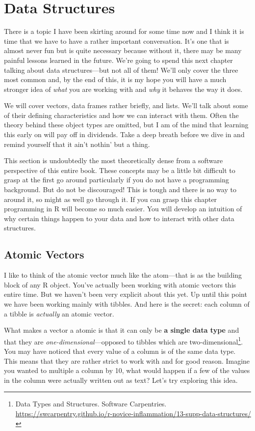 \documentclass[
]{book}
\begin{document}
\hypertarget{data-structures}{%
\chapter{Data Structures}\label{data-structures}}

There is a topic I have been skirting around for some time now and I think it is time that we have to have a rather important conversation. It's one that is almost never fun but is quite necessary because without it, there may be many painful lessons learned in the future. We're going to spend this next chapter talking about data structures---but not all of them! We'll only cover the three most common and, by the end of this, it is my hope you will have a much stronger idea of \emph{what} you are working with and \emph{why} it behaves the way it does.

We will cover vectors, data frames rather briefly, and lists. We'll talk about some of their defining characteristics and how we can interact with them. Often the theory behind these object types are omitted, but I am of the mind that learning this early on will pay off in dividends. Take a deep breath before we dive in and remind yourself that it ain't nothin' but a thing.

This section is undoubtedly the most theoretically dense from a software perspective of this entire book. These concepts may be a little bit difficult to grasp at the first go around particularly if you do not have a programming background. But do not be discouraged! This is tough and there is no way to around it, so might as well go through it. If you can grasp this chapter programming in R will become so much easier. You will develop an intuition of why certain things happen to your data and how to interact with other data structures.

\hypertarget{atomic-vectors}{%
\section{Atomic Vectors}\label{atomic-vectors}}

I like to think of the atomic vector much like the atom---that is as the building block of any R object. You've actually been working with atomic vectors this entire time. But we haven't been very explicit about this yet. Up until this point we have been working mainly with tibbles. And here is the secret: each column of a tibble is \emph{actually} an atomic vector.

What makes a vector a atomic is that it can only be \textbf{a single data type} and that they are \emph{one-dimensional}---opposed to tibbles which are two-dimensional\footnote{Data Types and Structures. Software Carpentries. \url{https://swcarpentry.github.io/r-novice-inflammation/13-supp-data-structures/}}. You may have noticed that every value of a column is of the same data type. This means that they are rather strict to work with and for good reason. Imagine you wanted to multiple a column by 10, what would happen if a few of the values in the column were actually written out as text? Let's try exploring this idea.
\end{document}
